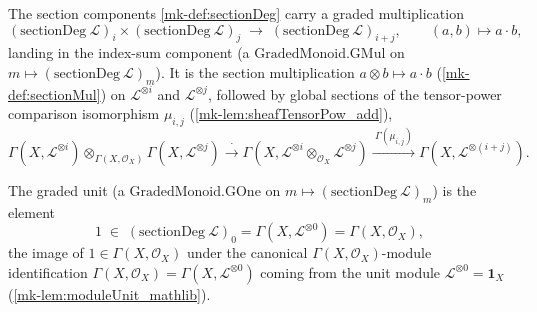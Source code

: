 \begin{definition}
  \label{mk-def:sectionGradedGMul}

  The section components \ref{mk-def:sectionDeg} carry a graded multiplication
  \[
    (\mathrm{sectionDeg}\ \mathcal{L})_i \times
      (\mathrm{sectionDeg}\ \mathcal{L})_j
    \;\longrightarrow\; (\mathrm{sectionDeg}\ \mathcal{L})_{i+j},
    \qquad (a, b) \longmapsto a \cdot b,
  \]
  landing in the index-sum component (a \(\mathrm{GradedMonoid.GMul}\) on
  \(m \mapsto (\mathrm{sectionDeg}\ \mathcal{L})_m\)). It is the section
  multiplication \(a \otimes b \mapsto a \cdot b\) (\ref{mk-def:sectionMul}) on
  \(\mathcal{L}^{\otimes i}\) and \(\mathcal{L}^{\otimes j}\), followed by global
  sections of the tensor-power comparison isomorphism \(\mu_{i,j}\)
  (\ref{mk-lem:sheafTensorPow_add}),
  \[
    \Gamma(X, \mathcal{L}^{\otimes i}) \otimes_{\Gamma(X,\mathcal{O}_X)}
      \Gamma(X, \mathcal{L}^{\otimes j})
    \xrightarrow{\ \cdot\ }
    \Gamma(X, \mathcal{L}^{\otimes i} \otimes_{\mathcal{O}_X}
      \mathcal{L}^{\otimes j})
    \xrightarrow{\ \Gamma(\mu_{i,j})\ }
    \Gamma(X, \mathcal{L}^{\otimes (i+j)}).
  \]
\end{definition}

\begin{definition}
  \label{mk-def:sectionGradedGOne}

  The graded unit (a \(\mathrm{GradedMonoid.GOne}\) on
  \(m \mapsto (\mathrm{sectionDeg}\ \mathcal{L})_m\)) is the element
  \[
    1 \;\in\; (\mathrm{sectionDeg}\ \mathcal{L})_0
      = \Gamma(X, \mathcal{L}^{\otimes 0}) = \Gamma(X, \mathcal{O}_X),
  \]
  the image of \(1 \in \Gamma(X, \mathcal{O}_X)\) under the canonical
  \(\Gamma(X,\mathcal{O}_X)\)-module identification
  \(\Gamma(X, \mathcal{O}_X) = \Gamma(X, \mathcal{L}^{\otimes 0})\) coming from the
  unit module \(\mathcal{L}^{\otimes 0} = \mathbf{1}_X\)
  (\ref{mk-lem:moduleUnit_mathlib}).
\end{definition}

